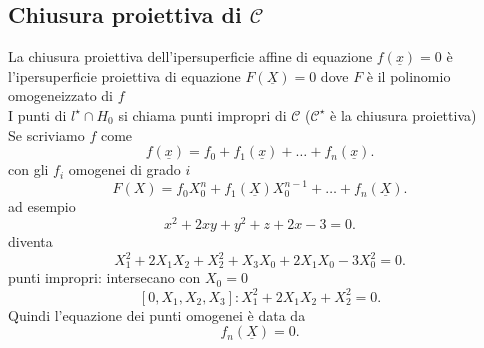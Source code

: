 \documentclass[12px]{article}
\begin{document}
	\subsection {Chiusura proiettiva di $\mathscr{C}$ }
	La chiusura proiettiva dell'ipersuperficie affine di equazione $f(\underline x) =0$ è l'ipersuperficie proiettiva di equazione  $F(\underline X)=0$ dove  $F$ è il polinomio omogeneizzato  di $f$\\
	I punti di  $l^\star \cap H_0$ si chiama punti impropri di $\mathscr{C}$ ($\mathscr{C}^\star$ è la chiusura proiettiva)\\
	Se scriviamo $f$ come\\
	\[
	 f(\underline x) = f_0 + f_1(\underline x) + \ldots + f_n(\underline x)
	.\] 
	con gli $f_i$ omogenei di grado $i$
	 \[
		 F(X) = f_0 X_0^n + f_1(\underline X)X_0^{n-1}+\ldots+f_n(\underline X)
	.\] 
	ad esempio
	\[
	x^2 + 2xy + y^2 + z+ 2x-3 = 0
	.\] 
	diventa
	\[
	X_1^2 + 2X_1X_2 + X_2^2 +X_3X_0 + 2X_1X_0-3X_0^2=0
	.\] 
	punti impropri: intersecano con $X_0 =0 $\\
	\[
		[0,X_1,X_2,X_3]:X_1^2 + 2X_1X_2 + X_2^2 =0 
	.\] 
	Quindi l'equazione dei punti omogenei è data da 
	\[
	 f_n(\underline X) = 0
	.\] 
\end{document}
